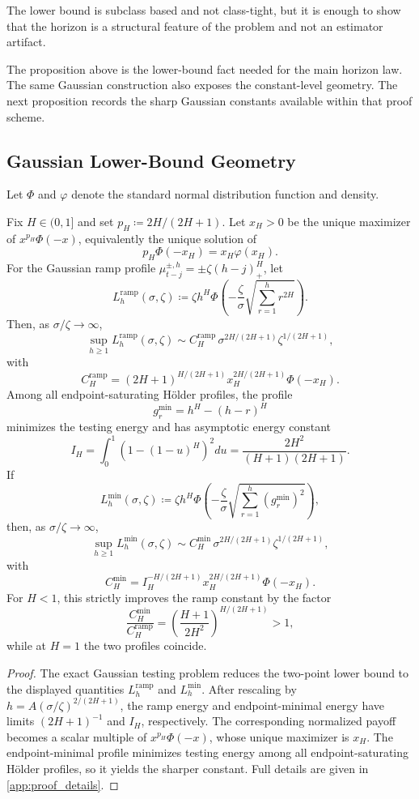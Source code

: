 The lower bound is subclass based and not class-tight, but it is enough to show
that the horizon is a structural feature of the problem and not an estimator
artifact.

The proposition above is the lower-bound fact needed for the main horizon law.
The same Gaussian construction also exposes the constant-level geometry.
The next proposition records the sharp Gaussian constants available within that
proof scheme.

\subsection{Gaussian Lower-Bound Geometry}
\label{subsec:gaussian_lower_bound_geometry}

Let $\Phi$ and $\varphi$ denote the standard normal distribution function and
density.
\begin{proposition}
\label{prop:gaussian_lower_bound_constants}
Fix $H\in(0,1]$ and set $p_H \coloneqq 2H/(2H+1)$. Let $x_H>0$ be the unique
maximizer of $x^{p_H}\Phi(-x)$, equivalently the unique solution of
\[
  p_H\Phi(-x_H)=x_H\varphi(x_H).
\]
For the Gaussian ramp profile $\mu_{t-j}^{\pm,h}=\pm\zeta(h-j)_+^H$, let
\[
  L_h^{\mathrm{ramp}}(\sigma,\zeta)
  \coloneqq
  \zeta h^H\Phi\!\left(-\frac{\zeta}{\sigma}\sqrt{\sum_{r=1}^h r^{2H}}\right).
\]
Then, as $\sigma/\zeta\to\infty$,
\[
  \sup_{h\ge 1} L_h^{\mathrm{ramp}}(\sigma,\zeta)
  \sim
  C_H^{\mathrm{ramp}}\,\sigma^{2H/(2H+1)}\zeta^{1/(2H+1)},
\]
with
\[
  C_H^{\mathrm{ramp}}
  =
  (2H+1)^{H/(2H+1)}x_H^{2H/(2H+1)}\Phi(-x_H).
\]
Among all endpoint-saturating H\"older profiles, the profile
\[
  g_r^{\min}=h^H-(h-r)^H
\]
minimizes the testing energy and has asymptotic energy constant
\[
  I_H
  =
  \int_0^1 \left(1-(1-u)^H\right)^2du
  =
  \frac{2H^2}{(H+1)(2H+1)}.
\]
If
\[
  L_h^{\min}(\sigma,\zeta)
  \coloneqq
  \zeta h^H\Phi\!\left(-\frac{\zeta}{\sigma}\sqrt{\sum_{r=1}^h (g_r^{\min})^2}\right),
\]
then, as $\sigma/\zeta\to\infty$,
\[
  \sup_{h\ge 1} L_h^{\min}(\sigma,\zeta)
  \sim
  C_H^{\min}\,\sigma^{2H/(2H+1)}\zeta^{1/(2H+1)},
\]
with
\[
  C_H^{\min}
  =
  I_H^{-H/(2H+1)}x_H^{2H/(2H+1)}\Phi(-x_H).
\]
For $H<1$, this strictly improves the ramp constant by the factor
\[
  \frac{C_H^{\min}}{C_H^{\mathrm{ramp}}}
  =
  \left(\frac{H+1}{2H^2}\right)^{H/(2H+1)}
  >1,
\]
while at $H=1$ the two profiles coincide.
\end{proposition}

\begin{proof}
The exact Gaussian testing problem reduces the two-point lower bound to the
displayed quantities $L_h^{\mathrm{ramp}}$ and $L_h^{\min}$. After rescaling by
$h=A(\sigma/\zeta)^{2/(2H+1)}$, the ramp energy and endpoint-minimal energy have
limits $(2H+1)^{-1}$ and $I_H$, respectively. The corresponding normalized
payoff becomes a scalar multiple of $x^{p_H}\Phi(-x)$, whose unique maximizer is
$x_H$. The endpoint-minimal profile minimizes testing energy among all
endpoint-saturating H\"older profiles, so it yields the sharper constant. Full
details are given in \cref{app:proof_details}.
\end{proof}

